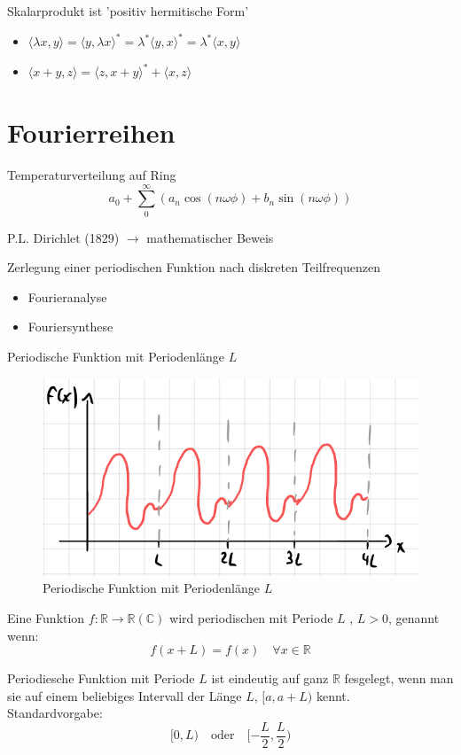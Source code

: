 \documentclass{physikprotokoll}
\begin{document}
	\begin{Bem}
		Skalarprodukt ist 'positiv hermitische Form'
		\begin{itemize}
			\item $\langle \lambda x,y\rangle = \langle y,\lambda x\rangle^\ast = \lambda^\ast \langle y, x\rangle^\ast=
					\lambda^\ast \langle x,y\rangle$
			\item $\langle x+y,z\rangle = \langle z,x+y\rangle^\ast + \langle x,z\rangle$
		\end{itemize}
	\end{Bem}

	\newpage
	\section{Fourierreihen}
	Temperaturverteilung auf Ring
	$$a_0 + \sum_0^\infty (a_n \cos(n\omega\phi) + b_n \sin(n\omega\phi))$$

	P.L. Dirichlet (1829) $\rightarrow$ mathematischer Beweis

	Zerlegung einer periodischen Funktion nach diskreten Teilfrequenzen
	\begin{itemize}
		\item Fourieranalyse
		\item Fouriersynthese
	\end{itemize}

	Periodische Funktion mit Periodenlänge $L$
	\begin{figure}[H]
		\centering
		\includegraphics[width=0.7\linewidth]{Grafiken/Fourierreihen/Grafik1.PNG}
		\caption{Periodische Funktion mit Periodenlänge $L$}
		\label{}
	\end{figure}

	\begin{Def}
		Eine Funktion $f: \mathbb{R}\rightarrow\mathbb{R}(\mathbb{C})$ wird periodischen
		mit Periode $L$ , $L>0$, genannt wenn:
		$$f(x+L) = f(x) \quad \forall x \in \mathbb{R}$$
	\end{Def}

	\begin{Bem}
		Periodiesche Funktion mit Periode $L$ ist eindeutig auf ganz $\mathbb{R}$ fesgelegt,
		wenn man sie auf einem beliebiges Intervall der Länge $L$, $[a,a+L)$ kennt.\\
		Standardvorgabe:
		$$[0,L) \quad \textrm{oder} \quad [-\frac{L}{2}, \frac{L}{2})$$
	\end{Bem}
\end{document}
